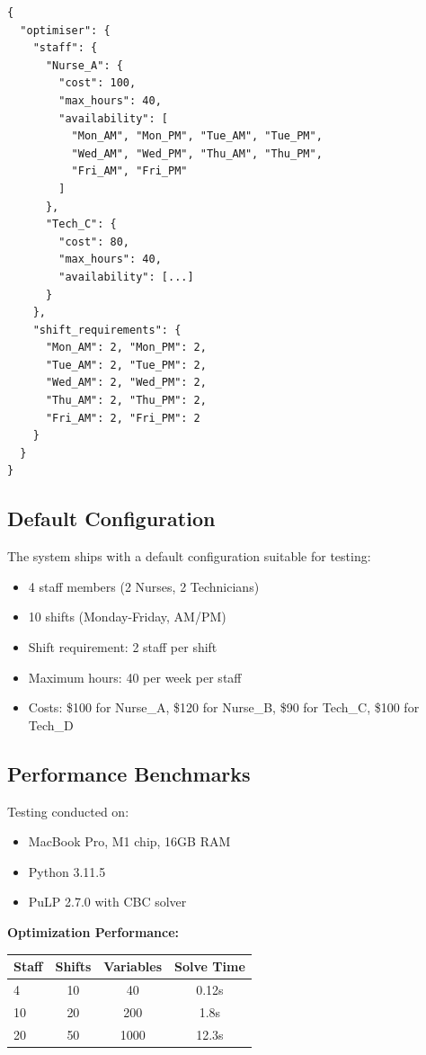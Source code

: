 \documentclass[12pt,a4paper]{article}
\begin{document}
\begin{lstlisting}
{
  "optimiser": {
    "staff": {
      "Nurse_A": {
        "cost": 100,
        "max_hours": 40,
        "availability": [
          "Mon_AM", "Mon_PM", "Tue_AM", "Tue_PM",
          "Wed_AM", "Wed_PM", "Thu_AM", "Thu_PM",
          "Fri_AM", "Fri_PM"
        ]
      },
      "Tech_C": {
        "cost": 80,
        "max_hours": 40,
        "availability": [...]
      }
    },
    "shift_requirements": {
      "Mon_AM": 2, "Mon_PM": 2,
      "Tue_AM": 2, "Tue_PM": 2,
      "Wed_AM": 2, "Wed_PM": 2,
      "Thu_AM": 2, "Thu_PM": 2,
      "Fri_AM": 2, "Fri_PM": 2
    }
  }
}
\end{lstlisting}

\subsection{Default Configuration}

The system ships with a default configuration suitable for testing:
\begin{itemize}
    \item 4 staff members (2 Nurses, 2 Technicians)
    \item 10 shifts (Monday-Friday, AM/PM)
    \item Shift requirement: 2 staff per shift
    \item Maximum hours: 40 per week per staff
    \item Costs: \$100 for Nurse\_A, \$120 for Nurse\_B, \$90 for Tech\_C, \$100 for Tech\_D
\end{itemize}

\subsection{Performance Benchmarks}

Testing conducted on:
\begin{itemize}
    \item MacBook Pro, M1 chip, 16GB RAM
    \item Python 3.11.5
    \item PuLP 2.7.0 with CBC solver
\end{itemize}

\textbf{Optimization Performance:}
\begin{center}
\begin{tabular}{lccc}
\toprule
Staff & Shifts & Variables & Solve Time \\
\midrule
4 & 10 & 40 & 0.12s \\
10 & 20 & 200 & 1.8s \\
20 & 50 & 1000 & 12.3s \\
\bottomrule
\end{tabular}
\end{center}
\end{document}
